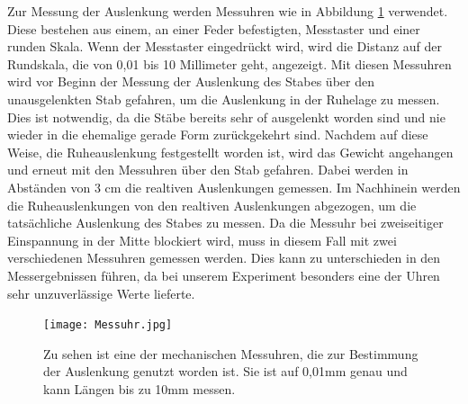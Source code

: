 \documentclass[titlepage = firstcover]{scrartcl}
\begin{document}
      Zur Messung der Auslenkung werden Messuhren wie in Abbildung \ref{fig:fotoUhr} verwendet. Diese bestehen aus einem, an einer Feder befestigten, Messtaster und einer runden Skala. Wenn der 
      Messtaster eingedrückt wird, wird die Distanz auf der Rundskala, die von 0,01 bis 10 Millimeter geht, angezeigt. Mit diesen Messuhren wird vor Beginn der
      Messung der Auslenkung des Stabes über den unausgelenkten Stab gefahren, um die Auslenkung in der Ruhelage zu messen. Dies ist notwendig, da die Stäbe 
      bereits sehr of ausgelenkt worden sind und nie wieder in die ehemalige gerade Form zurückgekehrt sind. Nachdem auf diese Weise, die Ruheauslenkung 
      festgestellt worden ist, wird das Gewicht angehangen und erneut mit den Messuhren über den Stab gefahren. Dabei werden in Abständen von 3 cm die realtiven 
      Auslenkungen gemessen. Im Nachhinein werden die Ruheauslenkungen von den realtiven Auslenkungen abgezogen, um die tatsächliche Auslenkung des Stabes zu
      messen. Da die Messuhr bei zweiseitiger Einspannung in der Mitte blockiert wird, muss in diesem Fall mit zwei verschiedenen Messuhren gemessen werden. Dies
      kann zu unterschieden in den Messergebnissen führen, da bei unserem Experiment besonders eine der Uhren sehr unzuverlässige Werte lieferte.
      
      \begin{figure}[h]
        \centering
        \texttt{[image: Messuhr.jpg]}
        \caption{Zu sehen ist eine der mechanischen Messuhren, die zur Bestimmung der Auslenkung genutzt worden ist. Sie ist auf 0,01mm genau und kann Längen bis zu 10mm messen.}
        \label{fig:fotoUhr}
      \end{figure}   

  
\end{document}
